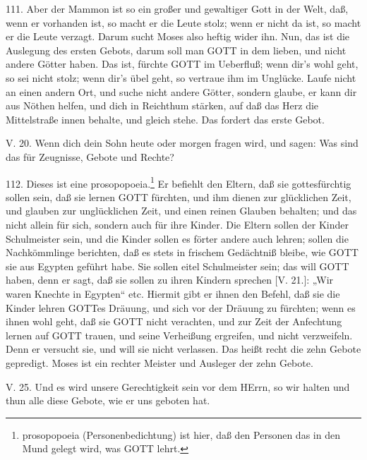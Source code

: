 111. Aber der Mammon ist so ein großer und gewaltiger Gott in der Welt, daß, wenn er
vorhanden ist, so macht er die Leute stolz; wenn er nicht da ist, so macht er die Leute verzagt. Darum sucht Moses also heftig wider ihn. Nun, das ist die Auslegung des ersten Gebots, darum soll man GOTT in dem lieben, und nicht andere Götter haben. Das ist, fürchte GOTT im Ueberfluß; wenn dir’s wohl geht, so sei nicht stolz; wenn dir’s übel geht, so vertraue ihm im Unglücke. Laufe nicht an einen andern Ort, und suche nicht andere Götter, sondern glaube, er kann dir aus Nöthen helfen, und dich in Reichthum stärken, auf daß das Herz die Mittelstraße innen behalte, und gleich stehe. Das fordert das erste Gebot.

\begin{schriftzitat}
V. 20. Wenn dich dein Sohn heute oder morgen fragen wird, und sagen: Was sind das für Zeugnisse, Gebote und Rechte?
\end{schriftzitat}

112. Dieses ist eine prosopopoeia.\footnote{prosopopoeia (Personenbedichtung) ist hier, daß den Personen das in den Mund gelegt wird, was GOTT lehrt.} Er befiehlt den Eltern, daß sie gottesfürchtig sollen sein, daß sie lernen GOTT fürchten, und ihm dienen zur glücklichen Zeit, und glauben zur unglücklichen Zeit, und einen reinen Glauben behalten; und das nicht allein für sich, sondern auch für ihre Kinder. Die Eltern sollen der Kinder Schulmeister sein, und die Kinder sollen es förter andere auch lehren; sollen die Nachkömmlinge berichten, daß es stets in frischem Gedächtniß bleibe, wie GOTT sie aus Egypten geführt habe. Sie sollen eitel Schulmeister sein; das will GOTT haben, denn er sagt, daß sie sollen zu ihren Kindern sprechen [V. 21.]: „Wir waren Knechte in Egypten“ etc. Hiermit gibt er ihnen den Befehl, daß sie die Kinder lehren GOTTes Dräuung, und sich vor der Dräuung zu fürchten; wenn es ihnen wohl geht, daß sie GOTT nicht verachten, und zur Zeit der Anfechtung lernen auf GOTT trauen, und seine Verheißung ergreifen, und nicht verzweifeln. Denn er versucht sie, und will sie nicht verlassen. Das heißt recht die zehn Gebote gepredigt. Moses ist ein rechter Meister und Ausleger der zehn Gebote.

\begin{schriftzitat}
V. 25. Und es wird unsere Gerechtigkeit sein vor dem HErrn, so wir halten und thun alle diese Gebote, wie er uns geboten hat.
\end{schriftzitat}


